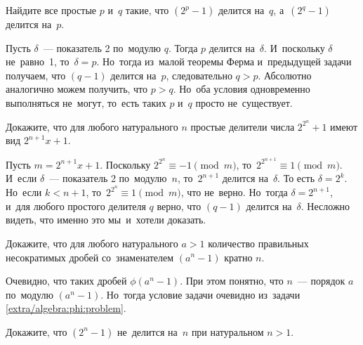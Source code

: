 \begin{problems}

\item
Найдите все простые $p$ и~$q$ такие, что $(2^p - 1)$ делится на~$q$,
а~$(2^q - 1)$ делится на~$p$.

\end{problems}

\ifincludesolutions
Пусть $\delta$~--- показатель 2 по~модулю $q$.
Тогда $p$ делится на~$\delta$.
И~поскольку $\delta$ не~равно~1, то~$\delta = p$.
Но~тогда из~малой теоремы Ферма и~предыдущей задачи получаем, что $(q - 1)$
делится на~$p$, следовательно $q > p$.
Абсолютно аналогично можем получить, что $p > q$.
Но~оба условия одновременно выполняться не~могут, то~есть таких $p$ и~$q$
просто не~существует.  
\fi %

\begin{problems}

\item
Докажите, что для любого натурального $n$ простые делители числа $2^{2^n} + 1$
имеют вид $2^{n+1} x + 1$.

\end{problems}

\ifincludesolutions
Пусть $m = 2^{n+1} x + 1$.
Поскольку $2^{2^n} \equiv -1 \pmod{m}$, то~$2^{2^{n+1}} \equiv 1 \pmod{m}$.
И~если $\delta$~--- показатель 2 по~модулю~$n$, то~$2^{n+1}$ делится
на~$\delta$.
То есть $\delta = 2^k$.
Но~если $k < n + 1$, то~$2^{2^n} \equiv 1 \pmod{m}$, что не~верно.
Но~тогда $\delta = 2^{n+1}$, и~для любого простого делителя $q$ верно, что
$(q - 1)$ делится на~$\delta$.
Несложно видеть, что именно это мы~и~хотели доказать.
\fi %

\begin{problems}

\item
Докажите, что для любого натурального $a > 1$ количество правильных
несократимых дробей со~знаменателем $(a^n - 1)$ кратно $n$.

\end{problems}

\ifincludesolutions
Очевидно, что таких дробей $\phi(a^n - 1)$.
При этом понятно, что $n$~--- порядок $a$ по~модулю $(a^n - 1)$.
Но~тогда условие задачи очевидно из~задачи \ref{extra/algebra:phi:problem}.
\fi %

\begin{problems}


\item
Докажите, что $(2^n - 1)$ не~делится на~$n$ при натуральном $n > 1$.

\end{problems}

